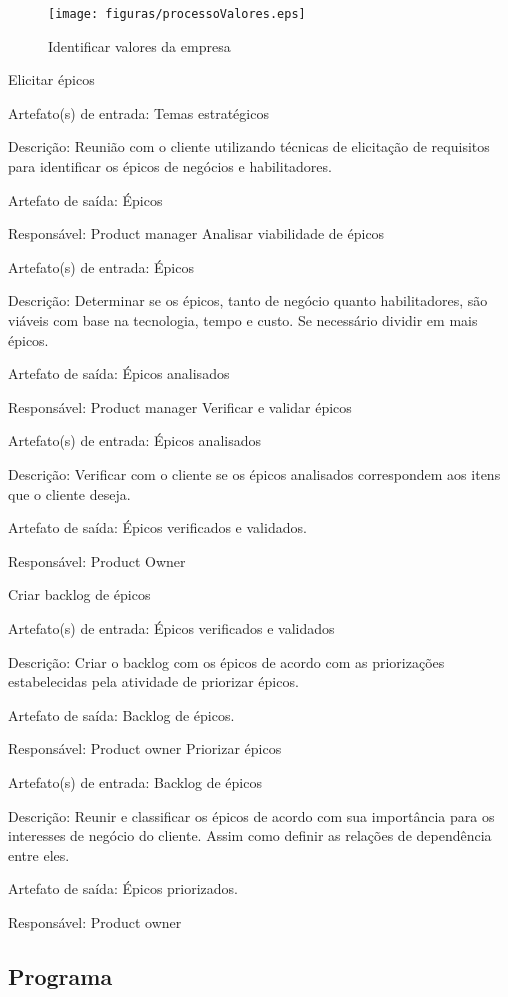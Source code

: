 \begin{figure}[H]
    \centering
    \caption{Identificar valores da empresa}
    \label{processoValores}
    \texttt{[image: figuras/processoValores.eps]}
\end{figure}

Elicitar épicos

Artefato(s) de entrada: Temas estratégicos

Descrição: Reunião com o cliente utilizando técnicas de elicitação de requisitos para identificar os épicos de negócios e habilitadores.

Artefato de saída: Épicos

Responsável: Product manager
Analisar viabilidade de épicos

Artefato(s) de entrada: Épicos

Descrição: Determinar se os épicos, tanto de negócio quanto habilitadores, são viáveis com base na tecnologia, tempo e custo. Se necessário dividir em mais épicos.

Artefato de saída: Épicos analisados

Responsável: Product manager
Verificar e validar épicos

Artefato(s) de entrada: Épicos analisados

Descrição: Verificar com o cliente se os épicos analisados correspondem aos itens que o cliente deseja.

Artefato de saída: Épicos verificados e validados.

Responsável: Product Owner

Criar backlog de épicos

Artefato(s) de entrada: Épicos verificados e validados

Descrição: Criar o backlog com os épicos de acordo com as priorizações estabelecidas pela atividade de priorizar épicos.

Artefato de saída: Backlog de épicos.

Responsável: Product owner
Priorizar épicos

Artefato(s) de entrada: Backlog de épicos

Descrição: Reunir e classificar os épicos de acordo com sua importância para os interesses de negócio do cliente. Assim como definir as relações de dependência entre eles.

Artefato de saída: Épicos priorizados.

Responsável: Product owner

\subsection{Programa}

